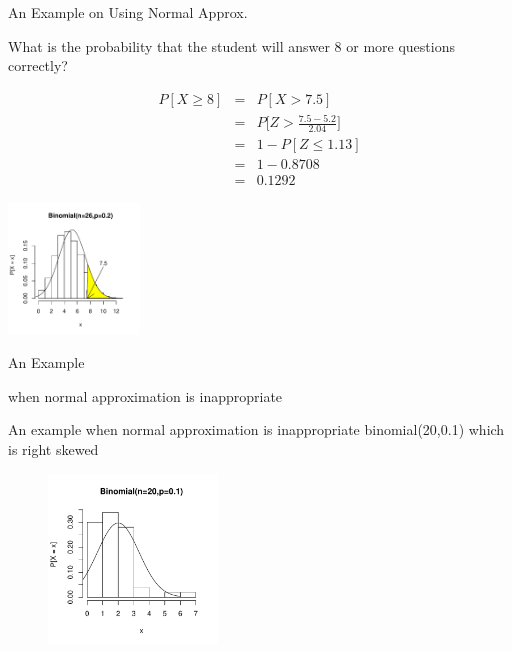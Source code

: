 \documentclass[14pt]{beamer}\usepackage[]{graphicx}\usepackage[]{color}
\begin{document}
\begin{frame}[fragile]{An Example on Using Normal Approx.}

What is the probability that the student will answer 8 or more questions correctly?

\begin{minipage}[ht]{4cm}

{\tiny{
\begin{eqnarray*}
P[X \ge 8] &=& P[X > 7.5] \\
  &=& P\Big[Z > \frac{7.5 - 5.2}{2.04} \Big] \\
  &=& 1 - P[ Z \le 1.13] \\
  &=& 1 - 0.8708 \\
  &=& 0.1292
\end{eqnarray*}
}}

\end{minipage}
\begin{minipage}[ht]{3.5cm}


\includegraphics[width=3.5cm]{figure/LBL7h-1} 


\end{minipage}
\end{frame}

\begin{frame}[fragile]{An Example}

\begin{center}{\tiny{when normal approximation is inappropriate}} \end{center}

An example when normal approximation is inappropriate binomial(20,0.1) which is
right skewed

\begin{figure}[ht]
\centering


\includegraphics[width=4.5cm]{figure/LBL7i-1} 

\end{figure}
\end{frame}
\end{document}
